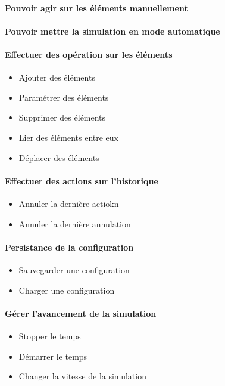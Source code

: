 {
	\paragraph{ Pouvoir agir sur les éléments manuellement}
	\paragraph{ Pouvoir mettre la simulation en mode automatique}
}
{
\paragraph{Effectuer des opération sur les éléments }
\begin{itemize}
	\item Ajouter des éléments
	\item Paramétrer des éléments
	\item Supprimer des éléments
	\item Lier des éléments entre eux
	\item Déplacer des éléments
\end{itemize}

\paragraph{Effectuer des actions sur l'historique}
\begin{itemize}
	\item Annuler la dernière actiokn
	\item Annuler la dernière annulation
\end{itemize}

\paragraph{Persistance de la configuration}
\begin{itemize}
	\item Sauvegarder une configuration
	\item Charger une configuration
\end{itemize}

\paragraph{Gérer l'avancement de la simulation}
\begin{itemize}
	\item Stopper le temps
	\item Démarrer le temps
	\item Changer la vitesse de la simulation
\end{itemize}

}
